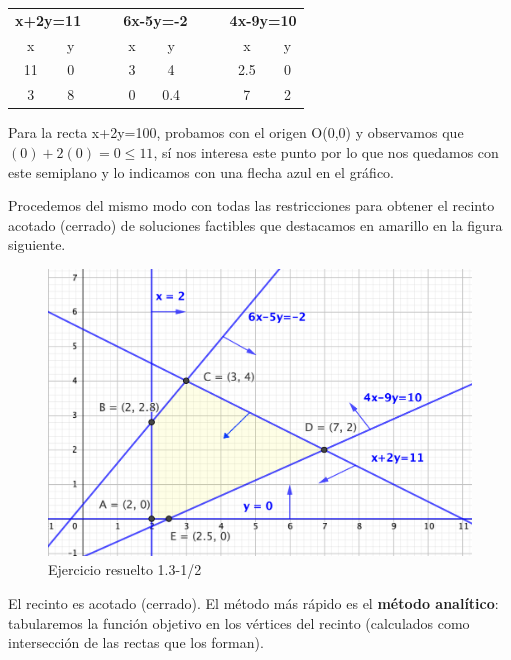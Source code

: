 \begin{table}[H]
\centering
\begin{tabular}{cccccccc}
\multicolumn{2}{c}{\textbf{x+2y=11}} & \textbf{} & \multicolumn{2}{c}{\textbf{6x-5y=-2}} & \textbf{} & \multicolumn{2}{c}{\textbf{4x-9y=10}} \\
\multicolumn{1}{c|}{x} & y & $\quad$ & \multicolumn{1}{c|}{x} & y & $\quad$ & \multicolumn{1}{c|}{x} & y \\ \cline{1-2} \cline{4-5} \cline{7-8} 
\multicolumn{1}{c|}{11} & 0 &  & \multicolumn{1}{c|}{3} & 4 &  & \multicolumn{1}{c|}{2.5} & 0 \\
\multicolumn{1}{c|}{3} & 8 &  & \multicolumn{1}{c|}{0} & 0.4 &  & \multicolumn{1}{c|}{7} & 2
\end{tabular}
\end{table}

\begin{small}
Para la recta x+2y=100, probamos con el origen O(0,0) y observamos que $(0)+2(0)=0\le 11$, sí nos interesa este punto por lo que nos quedamos con este semiplano y lo indicamos con una flecha azul en el gráfico.


Procedemos del mismo modo con todas las restricciones para obtener el recinto acotado (cerrado) de soluciones factibles que destacamos en amarillo en la figura siguiente.\end{small}


\begin{figure}[h]
	\centering
	\includegraphics[width=.75\textwidth]{imagenes/img14.png}
	\caption*{\small{Ejercicio resuelto 1.3-1/2}}
\end{figure}


\normalsize{El} recinto es acotado (cerrado). El método más rápido es el \textbf{método analítico}: tabularemos la función objetivo en los vértices del recinto (calculados como intersección de las rectas que los forman). 

